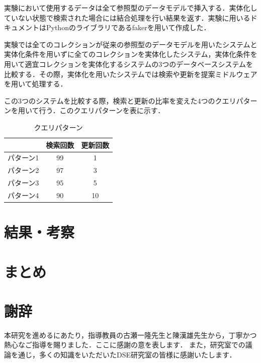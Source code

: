 \documentclass[a4paper,11pt]{ujreport}
\begin{document}
実験において使用するデータは全て参照型のデータモデルで挿入する．実体化していない状態で検索された場合には結合処理を行い結果を返す．実験に用いるドキュメントはPythonのライブラリであるfaker\cite{faker}を用いて作成した．


実験では全てのコレクションが従来の参照型のデータモデルを用いたシステムと実体化条件を用いずに全てのコレクションを実体化したシステム，実体化条件を用いて適宜コレクションを実体化するシステムの3つのデータベースシステムを比較する．その際，実体化を用いたシステムでは検索や更新を提案ミドルウェアを用いて処理する．

この3つのシステムを比較する際，検索と更新の比率を変えた4つのクエリパターンを用いて行う．このクエリパターンを表に示す．
\begin{table}[htb]
  \begin{center}
    \caption{クエリパターン}
		\label{table:experiment_query_pattern}
    \begin{tabular}{|l|c|c|} \hline
        & 検索回数 & 更新回数 \\ \hline
      パターン1 & 99 & 1\\ \hline
      パターン2 & 97 & 3\\ \hline
			パターン3 & 95 & 5\\ \hline
      パターン4 & 90 & 10\\ \hline
    \end{tabular}
  \end{center}
\end{table}

\chapter{結果・考察}

\chapter{まとめ}

\chapter*{謝辞}
本研究を進めるにあたり，指導教員の古瀬一隆先生と陳漢雄先生から，丁寧かつ熱心なご指導を賜りました．ここに感謝の意を表します．
また，研究室での議論を通じ，多くの知識をいただいたDSE研究室の皆様に感謝いたします．

\newpage

\renewcommand{\bibname}{参考文献}



\end{document}
